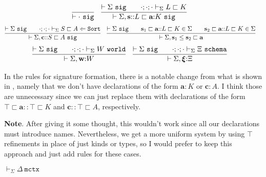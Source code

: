 \documentclass[letterpaper, 11pt]{article}
\newcommand{\Lar}{\Leftarrow}
\newcommand{\Sort}{\texttt{Sort}}
\newcommand{\world}{\texttt{world}}
\newcommand{\schema}{\texttt{schema}}
\newcommand{\mctx}{\texttt{mctx}}
\newcommand{\sig}{\texttt{sig}}
\begin{document}
    \begin{align*}
        & \infer{\vdash \cdot \ \sig}{} &
        & \infer{\vdash \Sigma, \textbf{s}{::}L \sqsubset \textbf{a} {:}  K \ \sig}
          {
            \vdash \Sigma \ \sig
            &&
            \cdot ; \cdot ; \cdot \vdash_\Sigma L \sqsubset K
          }
    \end{align*}
    \begin{align*}
        & \infer{\vdash \Sigma, \textbf{c} {::} S \sqsubset A \ \sig}
          {
            \vdash \Sigma \ \sig
            &&
            \cdot ; \cdot ; \cdot \vdash_\Sigma S \sqsubset A \Lar \Sort
          } &
        & \infer{\vdash \Sigma, \textbf{s}_1 \leq \textbf{s}_2 \sqsubset \textbf{a}}
          {
            \vdash \Sigma \ \sig
            &&
            \textbf{s}_1 \sqsubset \textbf{a} {::} L \sqsubset K \in \Sigma
            &&
            \textbf{s}_2 \sqsubset \textbf{a} {::} L \sqsubset K \in \Sigma
          }
    \end{align*}
    \begin{align*}
        & \infer{\vdash \Sigma , \textbf{w} {:} W}
          {
            \vdash \Sigma \ \sig
            &&
            \cdot ; \cdot ; \cdot \vdash_\Sigma W \ \world
          } &
        & \infer{\vdash \Sigma , \boldsymbol{\xi} {:} \Xi}
          {
            \vdash \Sigma \ \sig
            &&
            \cdot ; \cdot ; \cdot \vdash_\Sigma \Xi \ \schema
          } &
    \end{align*}

    In the rules for signature formation, there is a notable change from what is shown in \cite{LovasPfenning2010}, namely that we don't have
    declarations of the form $\textbf{a} {:} K$ or $\textbf{c} : A$.  I think those are unnecessary since we can just replace them with declarations
    of the form $\top \sqsubset \textbf{a} {::} \top \sqsubset K$ and $\textbf{c} {::} \top \sqsubset A$, respectively.

    \textbf{Note}.  After giving it some thought, this wouldn't work since all our declarations must introduce names.  Nevertheless, we get a more
    uniform system by using $\top$ refinements in place of just kinds or types, so I would prefer to keep this approach and just add rules for
    these cases.


    $\boxed{\vdash_\Sigma \Delta \ \mctx}$
\end{document}
